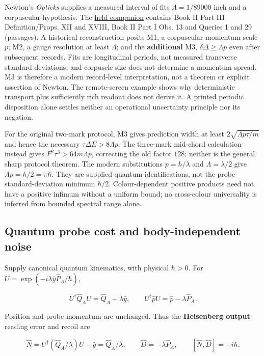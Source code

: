 \documentclass[11pt,a4paper]{article}
\begin{document}
Newton's \emph{Opticks} supplies a measured interval of fits
\(\Lambda=1/89000\) inch and a corpuscular hypothesis. The
\href{../docs/classics/Newton_Opticks_1730_fits_and_queries.md}{held
companion} contains Book II Part III Definition/Props. XII and XVIII,
Book II Part I Obs. 13 and Queries 1 and 29 (passages). A historical
reconstruction posits M1, a corpuscular momentum scale \(p\); M2, a
gauge resolution at least \(\Lambda\); and the \textbf{additional} M3,
\(\delta\Delta\ge\Lambda p\) even after subsequent records. Fits are
longitudinal periods, not measured transverse standard deviations, and
corpuscle size does not determine a momentum spread. M3 is therefore a
modern record-level interpretation, not a theorem or explicit assertion
of Newton. The remote-screen example shows why deterministic transport
plus sufficiently rich readout does not derive it. A printed periodic
disposition alone settles neither an operational uncertainty principle
nor its negation.

For the original two-mark protocol, M3 gives prediction width at least
\(2\sqrt{\Lambda p\tau/m}\) and hence the necessary
\(\tau\Delta E>8\Lambda p\). The three-mark mid-chord calculation
instead gives \(F^2\tau^3>64m\Lambda p\), correcting the old factor
\(128\); neither is the general sharp protocol theorem. The modern
substitutions \(p=h/\lambda\) and \(\Lambda=\lambda/2\) give
\(\Lambda p=h/2=\pi\hbar\). They are supplied quantum identifications,
not the probe standard-deviation minimum \(\hbar/2\). Colour-dependent
positive products need not have a positive infimum without a uniform
bound; no cross-colour universality is inferred from bounded spectral
range alone.

\hypertarget{quantum-probe-cost-and-body-independent-noise}{%
\subsection{Quantum probe cost and body-independent
noise}\label{quantum-probe-cost-and-body-independent-noise}}

Supply canonical quantum kinematics, with physical \(\hbar>0\). For
\(U=\exp(-i\lambda\hat y\hat P_A/\hbar)\),

\[U^\dagger\hat Q_AU=\hat Q_A+\lambda\hat y,\qquad
U^\dagger\hat pU=\hat p-\lambda\hat P_A.\]

Position and probe momentum are unchanged. Thus the \textbf{Heisenberg
output} reading error and recoil are

\[\hat N=U^\dagger(\hat Q_A/\lambda)U-\hat y=\hat Q_A/\lambda,
\qquad \hat D=-\lambda\hat P_A,\qquad [\hat N,\hat D]=-i\hbar.\]
\end{document}
